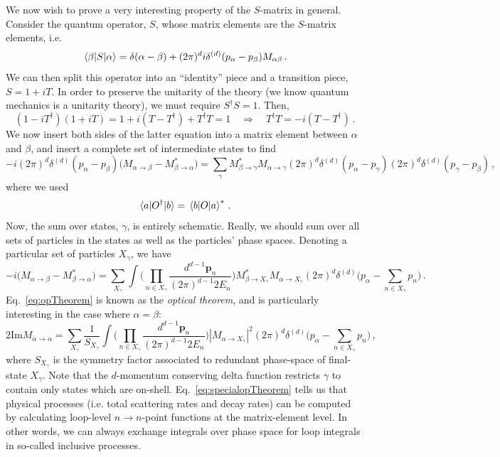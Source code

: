 \documentclass{article}
\numberwithin{equation}{subsection}
\begin{document}
We now wish to prove a very interesting property of the $S$-matrix in general. Consider the quantum operator, $S$, whose matrix elements are the $S$-matrix elements, i.e.
\begin{equation}
 \mel{\beta}{S}{\alpha} = \delta(\alpha - \beta) + (2\pi)^di\delta^{(d)}(p_\alpha - p_\beta)M_{\alpha\beta}\,.
\end{equation}
We can then split this operator into an ``identity'' piece and a transition piece, $S = 1 + iT$. In order to preserve the unitarity of the theory (we know
quantum mechanics is a unitarity theory), we must require $S^\dag S = 1$. Then,
\begin{equation}
 (1 - i T^\dag)(1 + iT) = 1 + i(T - T^\dag) + T^\dag T = 1 \quad \Rightarrow \quad T^\dag T = -i(T - T^\dag)\,.
\end{equation}
We now insert both sides of the latter equation into a matrix element between $\alpha$ and $\beta$, and insert a complete set of intermediate states to find
\begin{equation}\label{eq:opPartOne}
 -i(2\pi)^d\delta^{(d)}(p_\alpha - p_\beta)\big(M_{\alpha\to\beta} - M^*_{\beta \to \alpha}\big)
	= \sum_\gamma M^*_{\beta\to\gamma}M_{\alpha\to\gamma}(2\pi)^d\delta^{(d)}(p_\alpha - p_\gamma)(2\pi)^d\delta^{(d)}(p_\gamma - p_\beta)\,,
\end{equation}
where we used
\begin{equation}
 \mel{a}{O^\dag}{b} = \mel{b}{O}{a}^*\,.
\end{equation}
Now, the sum over states, $\gamma$, is entirely schematic. Really, we should sum over all sets of particles in the states as well as the particles'
phase spaces. Denoting a particular set of particles $X_\gamma$, we have
\begin{equation}\label{eq:opTheorem}
 -i\big(M_{\alpha\to\beta} - M^*_{\beta \to \alpha}\big) = \sum_{X_\gamma}\int\Bigg(\prod_{n\in X_\gamma}\frac{d^{d-1} \mathbf{p}_n}{(2\pi)^{d-1} 2E_n}\Bigg)
	M^*_{\beta\to X_\gamma} M_{\alpha\to X_\gamma}(2\pi)^d\delta^{(d)}\Bigg(p_\alpha - \sum_{n\in X_\gamma}p_n\Bigg)\,.
\end{equation}
Eq.~\eqref{eq:opTheorem} is known as the \textit{optical theorem}, and is particularly interesting in the case where $\alpha = \beta$:
\begin{equation}\label{eq:specialopTheorem}
 2\text{Im}M_{\alpha\to\alpha} = \sum_{X_\gamma}\frac{1}{S_{X_\gamma}}\int\Bigg(\prod_{n\in X_\gamma}\frac{d^{d-1} \mathbf{p}_n}{(2\pi)^{d-1} 2E_n}\Bigg)
	|M_{\alpha\to X_\gamma}|^2(2\pi)^d\delta^{(d)}\Bigg(p_\alpha - \sum_{n\in X_\gamma}p_n\Bigg)\,,
\end{equation}
where $S_{X_\gamma}$ is the symmetry factor associated to redundant phase-space of final-state $X_\gamma$.
Note that the $d$-momentum conserving delta function restricts $\gamma$ to contain only states which are on-shell. Eq.~\eqref{eq:specialopTheorem} tells
us that physical processes (i.e. total scattering rates and decay rates) can be computed by calculating loop-level $n\to n$-point functions at the
matrix-element level. In other words, we can always exchange integrals over phase space for loop integrals in so-called inclusive processes.
\end{document}
